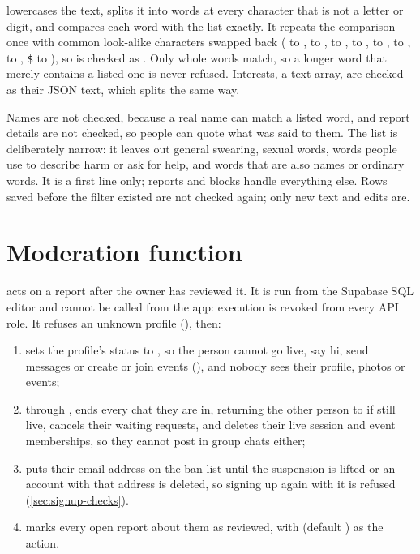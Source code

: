  lowercases the text, splits it into words at every character that is not a
letter or digit, and compares each word with the list exactly. It repeats the comparison once with common
look-alike characters swapped back ( to ,  to ,  to ,
 to ,  to ,  to ,  to , \texttt{\$} to
), so  is checked as . Only whole words match, so a longer word that merely
contains a listed one is never refused. Interests, a text array, are checked as their JSON text, which
splits the same way.

Names are not checked, because a real name can match a listed word, and report details are not checked,
so people can quote what was said to them. The list is deliberately narrow: it leaves out general
swearing, sexual words, words people use to describe harm or ask for help, and words that are also names
or ordinary words. It is a first line only; reports and blocks handle everything else. Rows saved before
the filter existed are not checked again; only new text and edits are.

\section{Moderation function}
\label{sec:moderation}

 acts on a report after the owner has reviewed it. It is run from
the Supabase SQL editor and cannot be called from the app: execution is revoked from every API role. It
refuses an unknown profile (), then:

\begin{enumerate}
  \item sets the profile's status to , so the person cannot go live, say hi, send
    messages or create or join events (), and nobody sees their profile, photos
    or events;
  \item through , ends every chat they are in, returning the other person to
     if still live, cancels their waiting requests, and deletes their live session and event
    memberships, so they cannot post in group chats either;
  \item puts their email address on the ban list until the suspension is lifted or an account with
    that address is deleted, so signing up again with it is refused (\cref{sec:signup-checks}).
  \item marks every open report about them as reviewed, with  (default ) as
    the action.
\end{enumerate}

